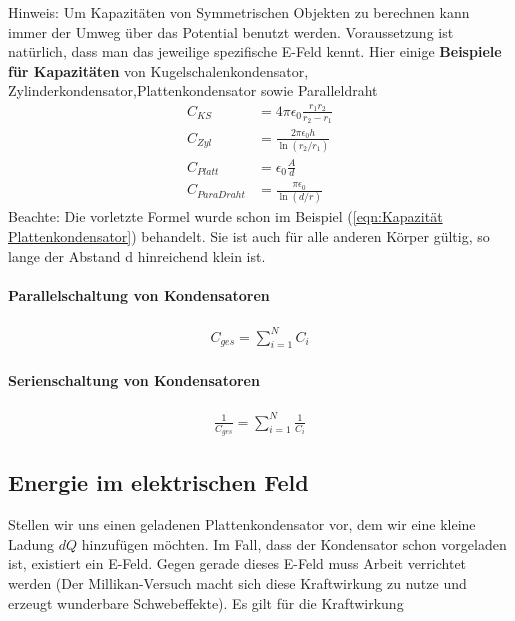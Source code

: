 Hinweis: Um Kapazitäten von Symmetrischen Objekten zu berechnen kann immer der Umweg über das Potential benutzt werden. Voraussetzung ist natürlich, dass man das jeweilige spezifische E-Feld kennt. Hier einige \textbf{Beispiele für Kapazitäten} von Kugelschalenkondensator, Zylinderkondensator,Plattenkondensator sowie Paralleldraht
\begin{align*}
C_{KS} 		&= 4\pi \epsilon_0 \frac{r_1 r_2}{r_2 - r_1} \\
C_{Zyl} 	&= \frac{2\pi \epsilon_0 h}{\ln  \left(r_2 / r_1\right) }\\
C_{Platt} 	&= \epsilon_0 \frac{A}{d}\\
C_{ParaDraht} &=  \frac{\pi \epsilon_0}{\ln\left( d/r\right)}
\end{align*}
Beachte: Die vorletzte Formel wurde schon im Beispiel (\ref{eqn:Kapazität Plattenkondensator}) behandelt. Sie ist auch für alle anderen Körper gültig, so lange der Abstand d hinreichend klein ist.

\paragraph{Parallelschaltung von Kondensatoren}
\begin{align} \label{eqn:gesKapazität Parallelschaltung}
\boxed{C_{ges} = \sum \limits_{i=1}^{N} C_i}
\end{align}

\paragraph{Serienschaltung von Kondensatoren}
\begin{align} \label{eqn:gesKapazität Serienschaltung}
\boxed{\frac{1}{C_{ges}} = \sum \limits_{i=1}^{N} \frac{1}{C_i}}
\end{align}

\subsection{Energie im elektrischen Feld}
Stellen wir uns einen geladenen Plattenkondensator vor, dem wir eine kleine Ladung $dQ$ hinzufügen möchten. Im Fall, dass der Kondensator schon vorgeladen ist, existiert ein E-Feld. Gegen gerade dieses E-Feld muss Arbeit verrichtet werden (Der Millikan-Versuch macht sich diese Kraftwirkung zu nutze und erzeugt wunderbare Schwebeffekte). Es  gilt für die Kraftwirkung 

